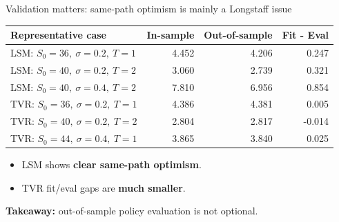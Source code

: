 \documentclass[
  11pt,
  ignorenonframetext,
  aspectratio=169,
]{beamer}
\providecommand{\tightlist}{%
  \setlength{\itemsep}{0pt}\setlength{\parskip}{0pt}}
\begin{document}
\begin{frame}{Validation matters: same-path optimism is mainly a
Longstaff issue}
\label{validation-matters-same-path-optimism-is-mainly-a-longstaff-issue}
\begin{table}
\small
\centering
\begin{tabular}{lrrr}
\toprule
Representative case & In-sample & Out-of-sample & Fit - Eval \\
\midrule
LSM: $S_0=36,\ \sigma=0.2,\ T=1$ & 4.452 & 4.206 & 0.247 \\
LSM: $S_0=40,\ \sigma=0.2,\ T=2$ & 3.060 & 2.739 & 0.321 \\
LSM: $S_0=40,\ \sigma=0.4,\ T=2$ & 7.810 & 6.956 & 0.854 \\
\midrule
TVR: $S_0=36,\ \sigma=0.2,\ T=1$ & 4.386 & 4.381 & 0.005 \\
TVR: $S_0=40,\ \sigma=0.2,\ T=2$ & 2.804 & 2.817 & -0.014 \\
TVR: $S_0=44,\ \sigma=0.4,\ T=1$ & 3.865 & 3.840 & 0.025 \\
\bottomrule
\end{tabular}%
\end{table}

\begin{itemize}
\tightlist
\item
  LSM shows \textbf{clear same-path optimism}.
\item
  TVR fit/eval gaps are \textbf{much smaller}.
\end{itemize}

\textbf{Takeaway:} out-of-sample policy evaluation is not optional.
\end{frame}
\end{document}
